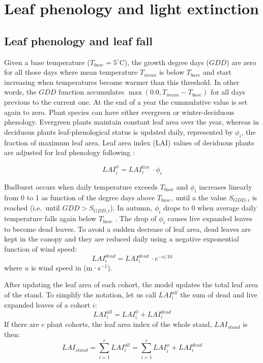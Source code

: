 \documentclass[]{book}
\begin{document}
\hypertarget{leaf-phenology-and-light-extinction}{%
\chapter{Leaf phenology and light extinction}\label{leaf-phenology-and-light-extinction}}

\hypertarget{leaf-phenology-and-leaf-fall}{%
\section{Leaf phenology and leaf fall}\label{leaf-phenology-and-leaf-fall}}

Given a base temperature (\(T_{base} = 5^{\circ} \mathrm{C}\)), the growth degree days (\(GDD\)) are zero for all those days where mean temperature \(T_{mean}\) is below \(T_{base}\) and start increasing when temperatures become warmer than this threshold. In other words, the \(GDD\) function accumulates \(\max(0.0, T_{mean} - T_{base})\) for all days previous to the current one. At the end of a year the cummulative value is set again to zero. Plant species can have either evergreen or winter-deciduous phenology. Evergreen plants maintain constant leaf area over the year, whereas in deciduous plants leaf-phenological status is updated daily, represented by \(\phi_i\), the fraction of maximum leaf area. Leaf area index (LAI) values of deciduous plants are adjusted for leaf phenology following \citep{Prentice1993, Sitch2003}:

\begin{equation}
LAI_{i}^{\phi}=LAI^{live}_i\,\cdot\phi_i
\end{equation}

Budburst occurs when daily temperature exceeds \(T_{base}\) and \(\phi_i\) increases
linearly from 0 to 1 as function of the degree days above \(T_{base}\), until a the
value \(S_{GDD,i}\) is reached (i.e.~until \(GDD > S_{GDD,i}\)). In autumn, \(\phi_i\)
drops to 0 when average daily temperature falls again below \(T_{base}\) \citep{Sitch2003}. The drop of \(\phi_i\) causes live expanded leaves to become dead leaves. To avoid a sudden decrease of leaf area, dead leaves are kept in the canopy and they are reduced daily using a negative exponential function of wind speed:
\begin{equation}
LAI^{dead}_i=LAI^{dead}_i\,\cdot e^{- u/10}
\end{equation}
where \(u\) is wind speed in (m·s\(^{-1}\)).

After updating the leaf area of each cohort, the model updates the total leaf area of the stand. To simplify the notation, let us call \(LAI^{all}_{i}\) the sum of dead and live expanded leaves of a cohort \(i\):
\begin{equation}
LAI^{all}_{i} = LAI^{\phi}_{i}+LAI^{dead}_{i}
\end{equation}
If there are \(c\) plant cohorts, the leaf area index of the whole stand, \(LAI_{stand}\)
is then:
\begin{equation}
LAI_{stand} = \sum_{i=1}^c{LAI_{i}^{all}}= \sum_{i=1}^c{LAI^{\phi}_{i}+LAI^{dead}_{i}}
\end{equation}
\end{document}
